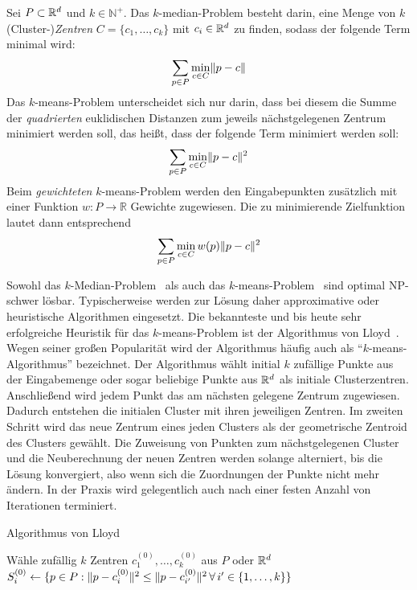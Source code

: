 \begin{definition}
\label{def:kmeans-kmedian}
Sei $P \subset \mathbb{R}^{d}$ und $k \in \mathbb{N}^{+}$. Das $k$-median-Problem besteht darin, eine Menge von $k$ (Cluster-)\emph{Zentren}
$C = \{ c_1, \dots, c_k \}$ mit $c_i \in \mathbb{R}^{d}$ zu finden, sodass der folgende Term minimal wird:
\[ \sum_{p \in P} \min_{c \in C} \lVert {p} - {c} \rVert \]
Das $k$-means-Problem unterscheidet sich nur darin, dass bei diesem die Summe der \emph{quadrierten} euklidischen Distanzen
zum jeweils nächstgelegenen Zentrum minimiert werden soll, das heißt, dass der folgende Term minimiert werden soll:
\[ \sum_{p \in P} \min_{c \in C} \lVert {p} - {c} \rVert^2 \]
Beim \emph{gewichteten} $k$-means-Problem werden den Eingabepunkten zusätzlich mit einer Funktion $w : P \rightarrow \mathbb{R}$
Gewichte zugewiesen. Die zu minimierende Zielfunktion lautet dann entsprechend
\[ \sum_{p \in P} \min_{c \in C} w(p) \lVert {p} - {c} \rVert^2 \]
\end{definition}
Sowohl das $k$-Median-Problem~\cite{MegiddoS84} als auch das $k$-means-Problem~\cite{AloiseDHP09} sind optimal NP-schwer lösbar.
Typischerweise werden zur Lösung daher approximative oder heuristische Algorithmen eingesetzt. Die bekannteste und bis
heute sehr erfolgreiche Heuristik für das $k$-means-Problem ist der Algorithmus von Lloyd~\cite{Lloyd82}. Wegen seiner
großen Popularität wird der Algorithmus häufig auch als "`$k$-means-Algorithmus"' bezeichnet.
Der Algorithmus wählt initial $k$ zufällige Punkte aus der Eingabemenge oder sogar beliebige Punkte aus $\mathbb{R}^{d}$ als initiale
Clusterzentren. Anschließend wird jedem Punkt das am nächsten gelegene Zentrum zugewiesen. Dadurch entstehen die initialen Cluster
mit ihren jeweiligen Zentren. Im zweiten Schritt wird das neue Zentrum eines jeden Clusters als der geometrische Zentroid
des Clusters gewählt. Die Zuweisung von Punkten zum nächstgelegenen Cluster und die Neuberechnung der neuen Zentren werden
solange alterniert, bis die Lösung konvergiert, also wenn sich die Zuordnungen der Punkte nicht mehr ändern. In der Praxis
wird gelegentlich auch nach einer festen Anzahl von Iterationen terminiert.

\begin{algorithm}[H]
\label{algo:lloyd}
\caption{Algorithmus von Lloyd}
	\DontPrintSemicolon
	
	\BlankLine
	
	Wähle zufällig $k$ Zentren $c_1^{(0)}, \dots, c_k^{(0)}$ aus $P$ oder $\mathbb{R}^{d}$\;
	$S_i^{(0)} \leftarrow \{ p \in P : \lVert {p} - {c_i^{(0)}} \rVert^2 \leq \lVert {p} - {c_{i'}^{(0)}} \rVert^2 \, \forall \, i' \in \{ 1, \dots, k \} \}$\;
\end{algorithm}

